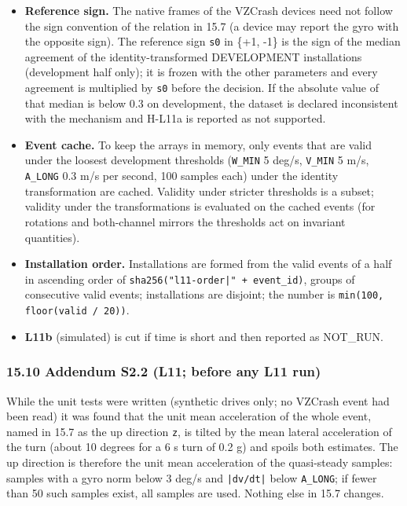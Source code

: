 \begin{itemize}
\item \textbf{Reference sign.} The native frames of the VZCrash devices need not follow the sign convention of the relation in 15.7 (a device may report the gyro with the opposite sign). The reference sign \texttt{s0} in \{+1, -1\} is the sign of the median agreement of the identity-transformed DEVELOPMENT installations (development half only); it is frozen with the other parameters and every agreement is multiplied by \texttt{s0} before the decision. If the absolute value of that median is below 0.3 on development, the dataset is declared inconsistent with the mechanism and H-L11a is reported as not supported.
\item \textbf{Event cache.} To keep the arrays in memory, only events that are valid under the loosest development thresholds (\texttt{W\_MIN} 5 deg/s, \texttt{V\_MIN} 5 m/s, \texttt{A\_LONG} 0.3 m/s per second, 100 samples each) under the identity transformation are cached. Validity under stricter thresholds is a subset; validity under the transformations is evaluated on the cached events (for rotations and both-channel mirrors the thresholds act on invariant quantities).
\item \textbf{Installation order.} Installations are formed from the valid events of a half in ascending order of \texttt{sha256("l11-order|" + event\_id)}, groups of consecutive valid events; installations are disjoint; the number is \texttt{min(100, floor(valid / 20))}.
\item \textbf{L11b} (simulated) is cut if time is short and then reported as NOT\_RUN.
\end{itemize}


\subsubsection*{15.10 Addendum S2.2 (L11; before any L11 run)}

While the unit tests were written (synthetic drives only; no VZCrash event had been read) it was found that the unit mean acceleration of the whole event, named in 15.7 as the up direction \texttt{z}, is tilted by the mean lateral acceleration of the turn (about 10 degrees for a 6 s turn of 0.2 g) and spoils both estimates. The up direction is therefore the unit mean acceleration of the quasi-steady samples: samples with a gyro norm below 3 deg/s and \texttt{|dv/dt|} below \texttt{A\_LONG}; if fewer than 50 such samples exist, all samples are used. Nothing else in 15.7 changes.

